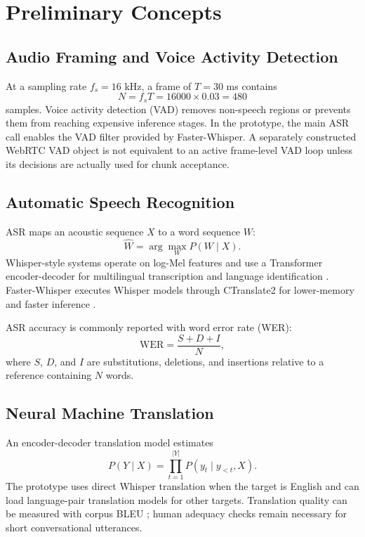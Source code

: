 \documentclass[conference]{IEEEtran}
\begin{document}
\section{Preliminary Concepts}

\subsection{Audio Framing and Voice Activity Detection}
At a sampling rate $f_s=16$ kHz, a frame of $T=30$ ms contains
\begin{equation}
N=f_sT=16000\times0.03=480
\end{equation}
samples. Voice activity detection (VAD) removes non-speech regions or prevents them from reaching expensive inference stages. In the prototype, the main ASR call enables the VAD filter provided by Faster-Whisper. A separately constructed WebRTC VAD object is not equivalent to an active frame-level VAD loop unless its decisions are actually used for chunk acceptance.

\subsection{Automatic Speech Recognition}
ASR maps an acoustic sequence $X$ to a word sequence $W$:
\begin{equation}
\hat{W}=\arg\max_W P(W\mid X).
\end{equation}
Whisper-style systems operate on log-Mel features and use a Transformer encoder-decoder for multilingual transcription and language identification \cite{radford2022whisper}. Faster-Whisper executes Whisper models through CTranslate2 for lower-memory and faster inference \cite{klein2020ctranslate2}.

ASR accuracy is commonly reported with word error rate (WER):
\begin{equation}
\mathrm{WER}=\frac{S+D+I}{N},
\end{equation}
where $S$, $D$, and $I$ are substitutions, deletions, and insertions relative to a reference containing $N$ words.

\subsection{Neural Machine Translation}
An encoder-decoder translation model estimates
\begin{equation}
P(Y\mid X)=\prod_{t=1}^{|Y|}P(y_t\mid y_{<t},X).
\end{equation}
The prototype uses direct Whisper translation when the target is English and can load language-pair translation models for other targets. Translation quality can be measured with corpus BLEU \cite{papineni2002bleu}; human adequacy checks remain necessary for short conversational utterances.
\end{document}
